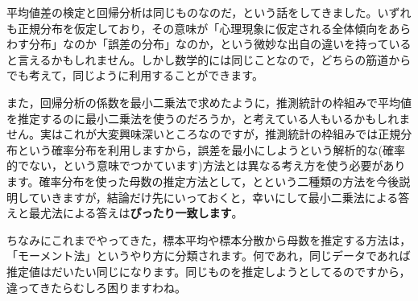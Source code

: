\documentclass{ltjsarticle}
\begin{document}
平均値差の検定と回帰分析は同じものなのだ，という話をしてきました。いずれも正規分布を仮定しており，その意味が「心理現象に仮定される全体傾向をあらわす分布」なのか「誤差の分布」なのか，という微妙な出自の違いを持っていると言えるかもしれません。しかし数学的には同じことなので，どちらの筋道からでも考えて，同じように利用することができます。

また，回帰分析の係数を最小二乗法で求めたように，推測統計の枠組みで平均値を推定するのに最小二乗法を使うのだろうか，と考えている人もいるかもしれません。実はこれが大変興味深いところなのですが，推測統計の枠組みでは正規分布という確率分布を利用しますから，誤差を最小にしようという解析的な(確率的でない，という意味でつかています)方法とは異なる考え方を使う必要があります。確率分布を使った母数の推定方法として，とという二種類の方法を今後説明していきますが，結論だけ先にいっておくと，幸いにして最小二乗法による答えと最尤法による答えは\textbf{ぴったり一致します}。

ちなみにこれまでやってきた，標本平均や標本分散から母数を推定する方法は，「モーメント法」というやり方に分類されます。何であれ，同じデータであれば推定値はだいたい同じになります。同じものを推定しようとしてるのですから，違ってきたらむしろ困りますわね。
\end{document}
